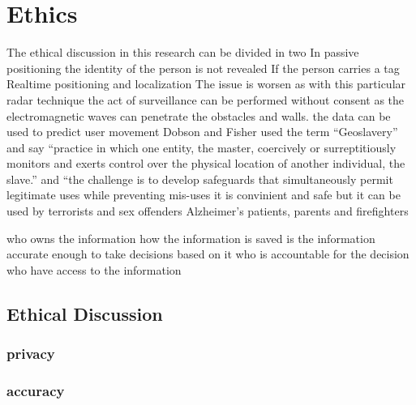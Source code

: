 \section{Ethics}
The ethical discussion in this research can be divided in two 
In passive positioning the identity of the person is not revealed
If the person carries a tag 
Realtime positioning and localization  
The issue is worsen as with this particular radar technique the act of surveillance can be performed without consent as the electromagnetic waves can penetrate the obstacles and walls.
the data can be used to predict user movement
Dobson and Fisher used the term “Geoslavery”\cite{Dobson2003} and say “practice in which
 one entity, the master, coercively or surreptitiously monitors and exerts control over the
 physical location of another individual, the slave.” and “the challenge is to develop safeguards that simultaneously permit
 legitimate uses while preventing mis-uses
 it is convinient and safe but it can be used by terrorists and sex offenders
 Alzheimer’s patients, parents and firefighters
 
 who owns the information 
 how the information is saved
 is the information accurate enough to take decisions based on it
 who is accountable for the decision
 who have access to the information
 \subsection{Ethical Discussion}
 \subsubsection{privacy}

 \subsubsection{accuracy}
 